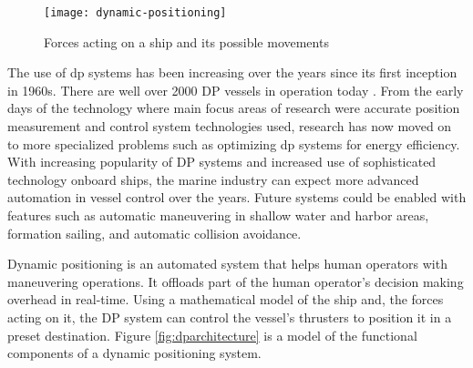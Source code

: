 \begin{figure}
	\centering
	\texttt{[image: dynamic-positioning]}
	\caption{Forces acting on a ship and its possible movements}
	\label{fig:shipforces}
\end{figure}

The use of dp systems has been increasing over the years since its first inception in 1960s. There are well over 2000 DP vessels in operation today \cite{sorensen2011survey}. From the early days of the technology where main focus areas of research were accurate position measurement and control system technologies used, research has now moved on to more specialized problems such as optimizing dp systems for energy efficiency. With increasing popularity of DP systems and increased use of sophisticated technology onboard ships, the marine industry can expect more advanced automation in vessel control over the years. Future systems could be enabled with features such as automatic maneuvering in shallow water and harbor areas, formation sailing, and automatic collision avoidance.




Dynamic positioning is an automated system that helps human operators with maneuvering operations. It offloads part of the human operator's decision making overhead in real-time. Using a mathematical model of the ship and, the forces acting on it, the DP system can control the vessel's thrusters to position it in a preset destination. Figure \ref{fig:dparchitecture} is a model of the functional components of a dynamic positioning system. 

